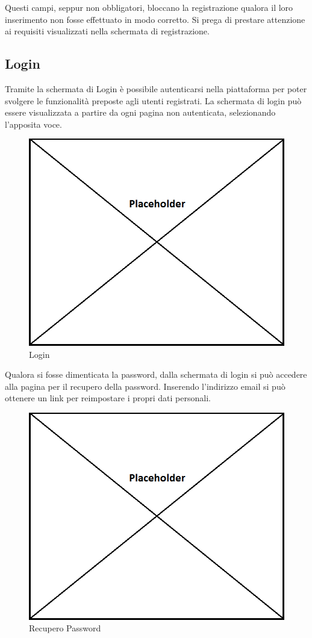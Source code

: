 Questi campi, seppur non obbligatori, bloccano la registrazione qualora il loro inserimento non fosse effettuato in modo corretto. Si prega di prestare attenzione ai requisiti visualizzati nella schermata di registrazione.

\subsection{Login}

Tramite la schermata di Login è possibile autenticarsi nella piattaforma per poter svolgere le funzionalità preposte agli utenti registrati. La schermata di login può essere visualizzata a partire da ogni pagina non autenticata, selezionando l'apposita voce.

\label{Login}
\begin{figure}[H]
	\centering
	\includegraphics[scale=0.45]{img/placeholder.png}
	\caption{Login}
\end{figure}

Qualora si fosse dimenticata la password, dalla schermata di login si può accedere alla pagina per il recupero della password. Inserendo l'indirizzo email si può ottenere un link per reimpostare i propri dati personali.

\label{Recupero Password}
\begin{figure}[H]
	\centering
	\includegraphics[scale=0.45]{img/placeholder.png}
	\caption{Recupero Password}
\end{figure}

